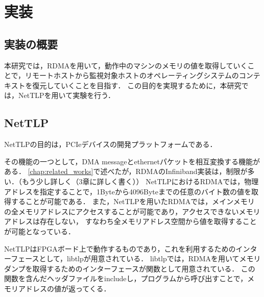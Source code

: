 \chapter{実装}
\label{chap:implementation}




\section{実装の概要}

本研究では，RDMAを用いて，動作中のマシンのメモリの値を取得していくことで，リモートホストから監視対象ホストのオペレーティングシステムのコンテキストを復元していくことを目指す．
この目的を実現するために，本研究では，NetTLP\cite{246316}を用いて実験を行う．

\section{NetTLP}
\label{section:nettlp}

NetTLPの目的は，PCIeデバイスの開発プラットフォームである．

その機能の一つとして，DMA messageとethernetパケットを相互変換する機能がある．
\ref{chap:related_works}で述べたが，RDMAのInfiniband実装は，制限が多い．（もう少し詳しく（3章に詳しく書く））
NetTLPにおけるRDMAでは，物理アドレスを指定することで，1Byteから4096Byteまでの任意のバイト数の値を取得することが可能である．
また，NetTLPを用いたRDMAでは，メインメモリの全メモリアドレスにアクセスすることが可能であり，アクセスできないメモリアドレスは存在しない，
すなわち全メモリアドレス空間から値を取得することが可能となっている．

NetTLPはFPGAボード上で動作するものであり，これを利用するためのインターフェースとして，libtlpが用意されている．
libtlpでは，RDMAを用いてメモリダンプを取得するためのインターフェースが関数として用意されている．
この関数を含んだヘッダファイルをincludeし，プログラムから呼び出すことで，メモリアドレスの値が返ってくる．

